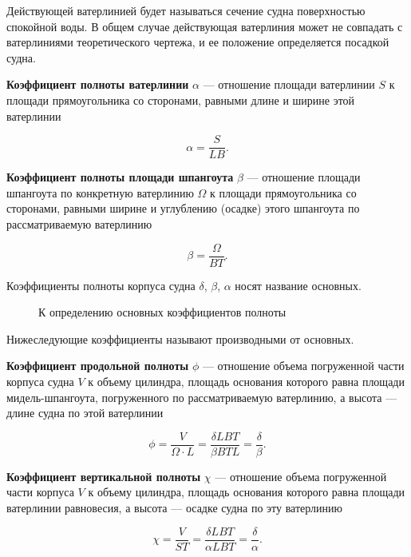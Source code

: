 Действующей ватерлинией будет называться сечение судна поверхностью спокойной воды.
В общем случае действующая ватерлиния может не совпадать с ватерлиниями теоретического чертежа, и ее положение определяется посадкой судна.

\textbf{Коэффициент полноты ватерлинии} $\alpha$ --- отношение площади ватерлинии $S$ к площади прямоугольника со сторонами, равными длине и ширине этой ватерлинии

\begin{equation}
    \alpha = \frac{S}{L B}.
\end{equation}

\textbf{Коэффициент полноты площади шпангоута} $\beta$ --- отношение площади шпангоута по конкретную ватерлинию $\Omega$ к площади прямоугольника со сторонами, равными ширине и углублению (осадке) этого шпангоута по рассматриваемую ватерлинию

\begin{equation}
    \beta = \frac{\Omega}{B T}.
\end{equation}

Коэффициенты полноты корпуса судна $\delta$, $\beta$, $\alpha$ носят название основных.

\begin{figure}[h!]
    \centerline{}
    \caption{К определению основных коэффициентов полноты}
\end{figure}

Нижеследующие коэффициенты называют производными от основных.

\textbf{Коэффициент продольной полноты} $\phi$ --- отношение объема погруженной части корпуса судна $V$ к объему цилиндра, площадь основания которого равна площади мидель-шпангоута, погруженного по рассматриваемую ватерлинию, а высота — длине судна по этой ватерлинии

\begin{equation}
    \phi = \frac{V}{\Omega \cdot L} = \frac{\delta L B T}{\beta B T L} = \frac{\delta}{\beta}.
\end{equation}

\textbf{Коэффициент вертикальной полноты} $\chi$ --- отношение объема погруженной части корпуса $V$ к объему цилиндра, площадь основания которого равна площади ватерлинии равновесия, а высота --- осадке судна по эту ватерлинию

\begin{equation}
    \chi = \frac{V}{S T} = \frac{\delta L B T}{\alpha L B T} = \frac{\delta}{\alpha}.
\end{equation}

